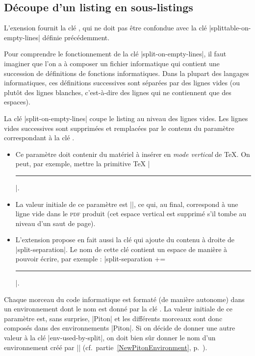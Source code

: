 \documentclass[dvipsnames,svgnames]{article}
\begin{document}
\bigskip
\subsection{Découpe d'un listing en sous-listings}

\label{split-on-empty-lines}

L'exension  fournit la clé , qui ne doit pas
être confondue avec la clé |splittable-on-empty-lines| définie précédemment. 

\smallskip
Pour comprendre le fonctionnement de la clé |split-on-empty-lines|, il faut imaginer que
l'on a à composer un fichier informatique qui contient une succession de définitions de
fonctions informatiques. Dans la plupart des langages informatiques, ces définitions
successives sont séparées par des lignes vides (ou plutôt des lignes blanches,
c'est-à-dire des lignes qui ne contiennent que des espaces). 

\smallskip
La clé |split-on-empty-lines| coupe le listing au niveau des lignes vides. Les lignes
vides successives sont supprimées et remplacées par le contenu du paramètre correspondant
à la clé .
\begin{itemize}
\item Ce paramètre doit contenir du matériel à insérer en \emph{mode vertical} de TeX. On
peut, par exemple, mettre la primitive TeX |\hrule|.

\item La valeur initiale de ce paramètre est
|\vspace{\baselineskip}\vspace{-1.25pt}|, ce qui, au final, correspond à une
ligne vide dans le \textsc{pdf} produit (cet espace vertical est supprimé s'il tombe au
niveau d'un saut de page).

\item L'extension  propose en fait aussi la clé  qui ajoute
du contenu à droite de |split-separation|. Le nom de cette clé contient un espace
de manière à pouvoir écrire, par exemple : |split-separation += \hrule|.
\end{itemize}

Chaque morceau du code informatique est formaté (de manière autonome) dans un
environnement dont le nom est donné par la clé .
La valeur initiale de ce paramètre est, sans surprise, |Piton| et les différents
morceaux sont donc composés dans des environnements |{Piton}|. Si on décide de
donner une autre valeur à la clé |env-used-by-split|, on doit bien sûr donner le
nom d'un environnement créé par |\NewPitonEnvironment|
(cf.~partie~\ref{NewPitonEnvironment}, p.~\pageref{NewPitonEnvironment}).
\end{document}
